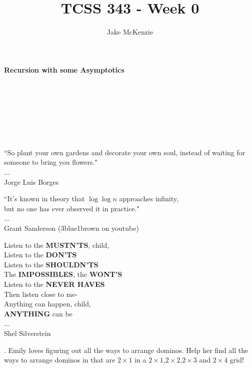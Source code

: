\documentclass[12pt]{article}
\begin{document}
\title{TCSS 343 - Week 0}
\author{Jake McKenzie}
\maketitle
\noindent\centerline{\textbf{Recursion with some Asymptotics}}\\\\\\\\\\\\
\begin{center}
    ``So plant your own gardens and decorate your own soul, instead of waiting for someone to bring you flowers." \\$\dots$\\ Jorge Luis Borges
\end{center}
\begin{center}
    ``It's known in theory that $\log{\log{n}}$ approaches infinity, \\but no one has ever observed it in practice." \\$\dots$\\ Grant Sanderson (3blue1brown on youtube)
\end{center}
\begin{center}
Listen to the \textbf{MUSTN'TS}, child,\\
      Listen to the \textbf{DON'TS}\\
      Listen to the \textbf{SHOULDN'TS}\\
The \textbf{IMPOSSIBLES}, the \textbf{WONT'S}\\
      Listen to the \textbf{NEVER HAVES}\\
Then listen close to me-\\
      Anything can happen, child,\\
      \textbf{ANYTHING} can be\\ 
      $\dots$\\
      Shel Silverstein 
\end{center}
    \newpage
{}. Emily loves figuring out all the ways to arrange dominos. Help her find all the ways to arrange dominos in that are $2 \times 1$ in a $2 \times 1$,$2 \times 2$,$2 \times 3$ and $2 \times 4$ grid!\\\\\\\\\\\\\\\\\\\\\\\\
\end{document}
